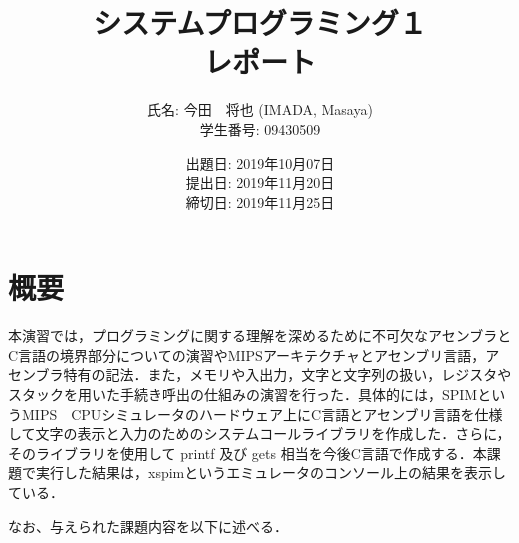 \documentclass[a4j,11pt]{jarticle}
\title{システムプログラミング１ \\
       レポート}
\author{氏名: 今田　将也 (IMADA, Masaya) \\
        学生番号: 09430509}
\date{出題日: 2019年10月07日 \\
      提出日: 2019年11月20日 \\
      締切日: 2019年11月25日 \\}  %
\begin{document}
\maketitle


\section{概要} \label{chap:abstract}

本演習では，プログラミングに関する理解を深めるために不可欠なアセンブラとC言語の境界部分についての演習やMIPSアーキテクチャとアセンブリ言語，アセンブラ特有の記法．また，メモリや入出力，文字と文字列の扱い，レジスタやスタックを用いた手続き呼出の仕組みの演習を行った．具体的には，SPIMというMIPS　CPUシミュレータのハードウェア上にC言語とアセンブリ言語を仕様して文字の表示と入力のためのシステムコールライブラリを作成した．さらに，そのライブラリを使用して printf 及び gets 相当を今後C言語で作成する．本課題で実行した結果は，xspimというエミュレータのコンソール上の結果を表示している．

なお、与えられた課題内容を以下に述べる．
\end{document}
